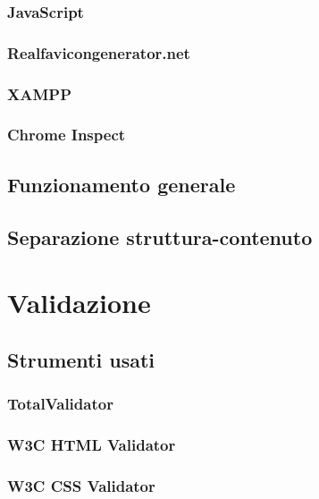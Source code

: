 \documentclass[a4paper, oneside, openany, dvipsnames, table]{article}
\begin{document}
		\subsubsection{JavaScript}
			
		\subsubsection{Realfavicongenerator.net}
			
		\subsubsection{XAMPP}
			
		\subsubsection{Chrome Inspect}
			
	\subsection{Funzionamento generale}
		
	\subsection{Separazione struttura-contenuto}
		
	
\newpage
\section{Validazione}
	
	\subsection{Strumenti usati}
		
		\subsubsection{TotalValidator }
			
		\subsubsection{W3C HTML Validator}
			
		\subsubsection{W3C CSS Validator}
			
\end{document}
